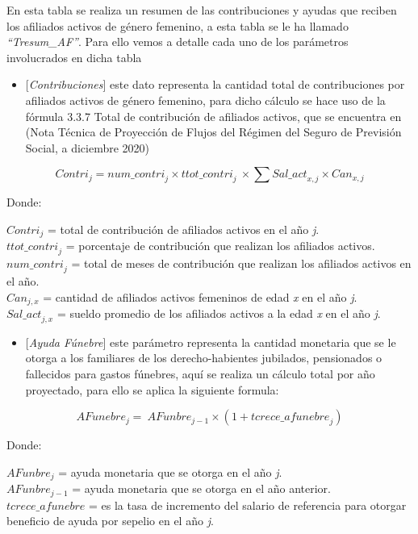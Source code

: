\documentclass[
  letterpaper,
  DIV=11,
  numbers=noendperiod]{scrreprt}
\providecommand{\tightlist}{%
  \setlength{\itemsep}{0pt}\setlength{\parskip}{0pt}}\usepackage{longtable,booktabs,array}
\begin{document}
En esta tabla se realiza un resumen de las contribuciones y ayudas que
reciben los afiliados activos de género femenino, a esta tabla se le ha
llamado \emph{``Tresum\_AF''}. Para ello vemos a detalle cada uno de los
parámetros involucrados en dicha tabla

\begin{itemize}
\tightlist
\item
  {[}\emph{Contribuciones}{]} este dato representa la cantidad total de
  contribuciones por afiliados activos de género femenino, para dicho
  cálculo se hace uso de la fórmula 3.3.7 Total de contribución de
  afiliados activos, que se encuentra en (Nota Técnica de Proyección de
  Flujos del Régimen del Seguro de Previsión Social, a diciembre 2020)
\end{itemize}

\begin{equation}
{Contri}_j={num\_contri}_j\times{ttot\_contri}_j\ \times\sum{{Sal\_act}_{x,j}\times{Can}_{x,j}}
\end{equation}

Donde:

\({Contri}_j\) = total de contribución de afiliados activos en el año
\emph{j}.\\
\({ttot\_contri}_j\) = porcentaje de contribución que realizan los
afiliados activos.\\
\({num\_contri}_j\) = total de meses de contribución que realizan los
afiliados activos en el año.\\
\({Can}_{j,x}\) = cantidad de afiliados activos femeninos de edad
\emph{x} en el año \emph{j}.\\
\({Sal\_act}_{j,x}\) = sueldo promedio de los afiliados activos a la
edad \emph{x} en el año \emph{j}.

\begin{itemize}
\tightlist
\item
  {[}\emph{Ayuda Fúnebre}{]} este parámetro representa la cantidad
  monetaria que se le otorga a los familiares de los derecho-habientes
  jubilados, pensionados o fallecidos para gastos fúnebres, aquí se
  realiza un cálculo total por año proyectado, para ello se aplica la
  siguiente formula:
\end{itemize}

\begin{equation}
AFunebre_j=\ AFunbre_{j-1}\times(1+{tcrece\_afunebre}_j)
\end{equation}

Donde:

\(AFunbre_j\) = ayuda monetaria que se otorga en el año \emph{j}.\\
\(AFunbre_{j-1}\) = ayuda monetaria que se otorga en el año anterior.\\
\(tcrece\_afunebre\) = es la tasa de incremento del salario de
referencia para otorgar beneficio de ayuda por sepelio en el año
\emph{j}.
\end{document}
